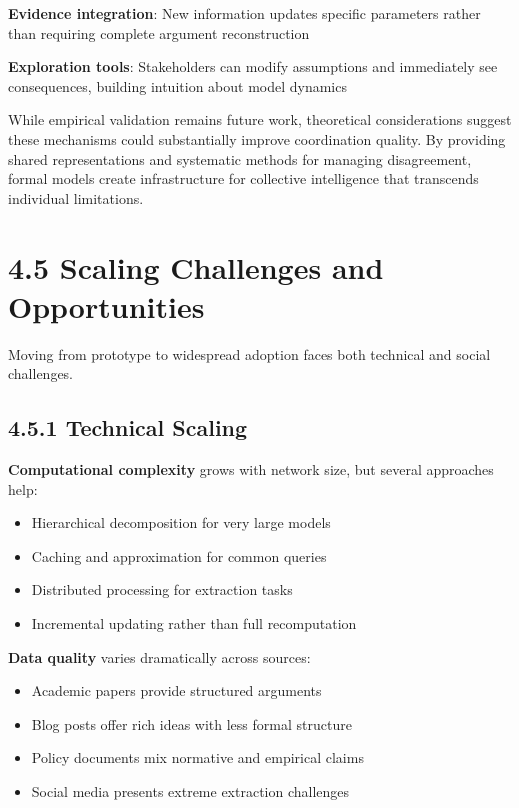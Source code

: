 \documentclass[
  11pt,
  letterpaper,
]{book}
\providecommand{\tightlist}{%
  \setlength{\itemsep}{0pt}\setlength{\parskip}{0pt}}
\begin{document}
\textbf{Evidence integration}: New information updates specific
parameters rather than requiring complete argument reconstruction

\textbf{Exploration tools}: Stakeholders can modify assumptions and
immediately see consequences, building intuition about model dynamics

While empirical validation remains future work, theoretical
considerations suggest these mechanisms could substantially improve
coordination quality. By providing shared representations and systematic
methods for managing disagreement, formal models create infrastructure
for collective intelligence that transcends individual limitations.

\section{4.5 Scaling Challenges and Opportunities}\label{sec-scaling}

Moving from prototype to widespread adoption faces both technical and
social challenges.

\subsection{4.5.1 Technical Scaling}\label{sec-technical-scaling}

\textbf{Computational complexity} grows with network size, but several
approaches help:

\begin{itemize}
\tightlist
\item
  Hierarchical decomposition for very large models
\item
  Caching and approximation for common queries
\item
  Distributed processing for extraction tasks
\item
  Incremental updating rather than full recomputation
\end{itemize}

\textbf{Data quality} varies dramatically across sources:

\begin{itemize}
\tightlist
\item
  Academic papers provide structured arguments
\item
  Blog posts offer rich ideas with less formal structure
\item
  Policy documents mix normative and empirical claims
\item
  Social media presents extreme extraction challenges
\end{itemize}
\end{document}
